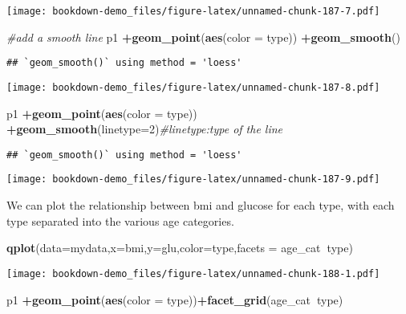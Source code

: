 \documentclass[]{book}
\newenvironment{Shaded}{\begin{snugshade}}{\end{snugshade}}
\newcommand{\KeywordTok}[1]{\textcolor[rgb]{0.13,0.29,0.53}{\textbf{#1}}}
\newcommand{\DataTypeTok}[1]{\textcolor[rgb]{0.13,0.29,0.53}{#1}}
\newcommand{\DecValTok}[1]{\textcolor[rgb]{0.00,0.00,0.81}{#1}}
\newcommand{\CommentTok}[1]{\textcolor[rgb]{0.56,0.35,0.01}{\textit{#1}}}
\newcommand{\OperatorTok}[1]{\textcolor[rgb]{0.81,0.36,0.00}{\textbf{#1}}}
\newcommand{\NormalTok}[1]{#1}
\theoremstyle{definition}
\theoremstyle{definition}
\theoremstyle{definition}
\theoremstyle{remark}
\begin{document}
\texttt{[image: bookdown-demo\_files/figure-latex/unnamed-chunk-187-7.pdf]}

\begin{Shaded}
\begin{Highlighting}[]
\CommentTok{#add a smooth line}
\NormalTok{p1 }\OperatorTok{+}\KeywordTok{geom_point}\NormalTok{(}\KeywordTok{aes}\NormalTok{(}\DataTypeTok{color =}\NormalTok{ type)) }\OperatorTok{+}\KeywordTok{geom_smooth}\NormalTok{()}
\end{Highlighting}
\end{Shaded}

\begin{verbatim}
## `geom_smooth()` using method = 'loess'
\end{verbatim}

\texttt{[image: bookdown-demo\_files/figure-latex/unnamed-chunk-187-8.pdf]}

\begin{Shaded}
\begin{Highlighting}[]
\NormalTok{p1 }\OperatorTok{+}\KeywordTok{geom_point}\NormalTok{(}\KeywordTok{aes}\NormalTok{(}\DataTypeTok{color =}\NormalTok{ type)) }\OperatorTok{+}\KeywordTok{geom_smooth}\NormalTok{(}\DataTypeTok{linetype=}\DecValTok{2}\NormalTok{)}\CommentTok{#linetype:type of the line}
\end{Highlighting}
\end{Shaded}

\begin{verbatim}
## `geom_smooth()` using method = 'loess'
\end{verbatim}

\texttt{[image: bookdown-demo\_files/figure-latex/unnamed-chunk-187-9.pdf]}

We can plot the relationship between bmi and glucose for each type, with
each type separated into the various age categories.

\begin{Shaded}
\begin{Highlighting}[]
\KeywordTok{qplot}\NormalTok{(}\DataTypeTok{data=}\NormalTok{mydata,}\DataTypeTok{x=}\NormalTok{bmi,}\DataTypeTok{y=}\NormalTok{glu,}\DataTypeTok{color=}\NormalTok{type,}\DataTypeTok{facets =}\NormalTok{ age_cat}\OperatorTok{~}\NormalTok{type)}
\end{Highlighting}
\end{Shaded}

\texttt{[image: bookdown-demo\_files/figure-latex/unnamed-chunk-188-1.pdf]}

\begin{Shaded}
\begin{Highlighting}[]
\NormalTok{p1 }\OperatorTok{+}\KeywordTok{geom_point}\NormalTok{(}\KeywordTok{aes}\NormalTok{(}\DataTypeTok{color =}\NormalTok{ type))}\OperatorTok{+}\KeywordTok{facet_grid}\NormalTok{(age_cat}\OperatorTok{~}\NormalTok{type)}
\end{Highlighting}
\end{Shaded}
\end{document}
